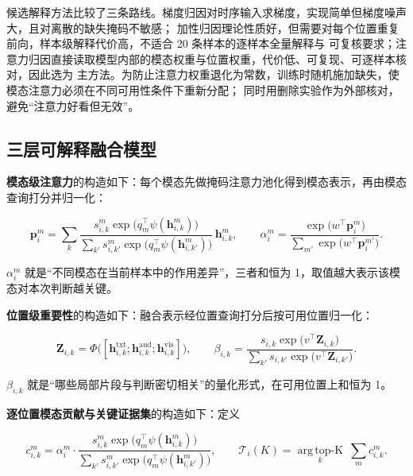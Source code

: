 \documentclass[bwprint]{gmcmthesis}
\begin{document}
候选解释方法比较了三条路线。梯度归因对时序输入求梯度，实现简单但梯度噪声大，且对离散的缺失掩码不敏感；
加性归因理论性质好，但需要对每个位置重复前向，样本级解释代价高，不适合 20 条样本的逐样本全量解释与
可复核要求；注意力归因直接读取模型内部的模态权重与位置权重，代价低、可复现、可逐样本核对，因此选为
主方法。为防止注意力权重退化为常数，训练时随机施加缺失，使模态注意力必须在不同可用性条件下重新分配；
同时用删除实验作为外部核对，避免“注意力好看但无效”。

\subsection{三层可解释融合模型}

\textbf{模态级注意力}的构造如下：每个模态先做掩码注意力池化得到模态表示，再由模态查询打分并归一化：

\begin{equation}
\mathbf{p}^{m}_i=\sum_k
\frac{s^{m}_{i,k}\exp\!\big(q_m^\top \psi(\mathbf{h}^{m}_{i,k})\big)}
{\sum_{k'} s^{m}_{i,k'}\exp\!\big(q_m^\top \psi(\mathbf{h}^{m}_{i,k'})\big)}\,
\mathbf{h}^{m}_{i,k},
\qquad
\alpha^{m}_i=\frac{\exp\!\big(w^\top \mathbf{p}^{m}_i\big)}
{\sum_{m'} \exp\!\big(w^\top \mathbf{p}^{m'}_i\big)} .
\label{eq:alpha}
\end{equation}

$\alpha^{m}_i$ 就是“不同模态在当前样本中的作用差异”，三者和恒为 1，取值越大表示该模态对本次判断越关键。

\textbf{位置级重要性}的构造如下：融合表示经位置查询打分后按可用位置归一化：

\begin{equation}
\mathbf{Z}_{i,k}=\Phi\big([\mathbf{h}^{\mathrm{txt}}_{i,k};
\mathbf{h}^{\mathrm{aud}}_{i,k};\mathbf{h}^{\mathrm{vis}}_{i,k}]\big),
\qquad
\beta_{i,k}=\frac{s_{i,k}\exp\!\big(v^\top \mathbf{Z}_{i,k}\big)}
{\sum_{k'} s_{i,k'}\exp\!\big(v^\top \mathbf{Z}_{i,k'}\big)} .
\label{eq:beta}
\end{equation}

$\beta_{i,k}$ 就是“哪些局部片段与判断密切相关”的量化形式，在可用位置上和恒为 1。

\textbf{逐位置模态贡献与关键证据集}的构造如下：定义

\begin{equation}
c^{m}_{i,k}=\alpha^{m}_i\cdot
\frac{s^{m}_{i,k}\exp\!\big(q_m^\top \psi(\mathbf{h}^{m}_{i,k})\big)}
{\sum_{k'} s^{m}_{i,k'}\exp\!\big(q_m^\top \psi(\mathbf{h}^{m}_{i,k'})\big)},
\qquad
\mathcal{T}_i(K)=\operatorname*{arg\,top\text{-}K}_{k}\ \sum_m c^{m}_{i,k} .
\label{eq:contrib}
\end{equation}
\end{document}
